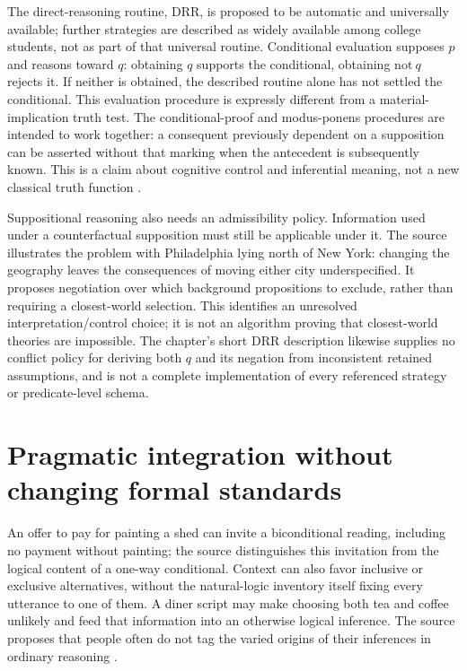 The direct-reasoning routine, DRR, is proposed to be automatic and
universally available; further strategies are described as widely
available among college students, not as part of that universal
routine. Conditional evaluation supposes \(p\) and reasons toward
\(q\): obtaining \(q\) supports the conditional, obtaining
\(\mathrm{not}\ q\) rejects it. If neither is obtained, the described
routine alone has not settled the conditional. This evaluation procedure
is expressly different from a material-implication truth test. The
conditional-proof and modus-ponens procedures are intended to work
together: a consequent previously dependent on a supposition can be
asserted without that marking when the antecedent is subsequently known.
This is a claim about cognitive control and inferential meaning, not a
new classical truth function \cite[pp.~218--219]{OBrien2021NaturalLogic}.

Suppositional reasoning also needs an admissibility policy. Information
used under a counterfactual supposition must still be applicable under
it. The source illustrates the problem with Philadelphia lying north
of New York: changing the geography leaves the consequences of moving
either city underspecified. It proposes negotiation over which
background propositions to exclude, rather than requiring a closest-world
selection. This identifies an unresolved interpretation/control choice;
it is not an algorithm proving that closest-world theories are impossible.
The chapter's short DRR description likewise supplies no conflict policy
for deriving both \(q\) and its negation from inconsistent retained
assumptions, and is not a complete implementation of every referenced
strategy or predicate-level schema.

\section{Pragmatic integration without changing formal standards}
\label{sec:p19-r32-pragmatics}

An offer to pay for painting a shed can invite a biconditional reading,
including no payment without painting; the source distinguishes this
invitation from the logical content of a one-way conditional. Context can
also favor inclusive or exclusive alternatives, without the natural-logic
inventory itself fixing every utterance to one of them. A diner script
may make choosing both tea and coffee unlikely and feed that information
into an otherwise logical inference. The source proposes that people
often do not tag the varied origins of their inferences in ordinary
reasoning \cite[p.~219]{OBrien2021NaturalLogic}.

